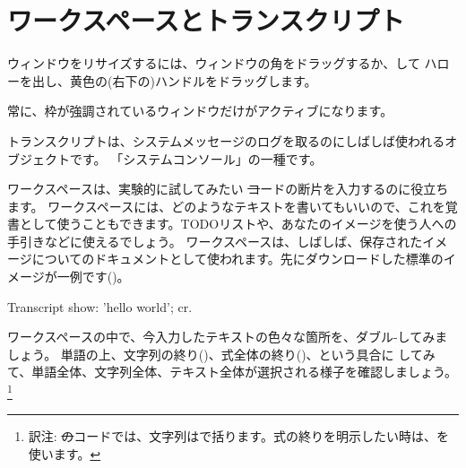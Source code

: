 \documentclass[a4paper,10pt,twoside]{book}
\begin{document}
\section{ワークスペースとトランスクリプト}


ウィンドウをリサイズするには、ウィンドウの角をドラッグするか、\metaclick して ハローを出し、黄色の(右下の)ハンドルをドラッグします。

常に、枠が強調されているウィンドウだけがアクティブになります。

トランスクリプトは、システムメッセージのログを取るのにしばしば使われるオブジェクトです。
「システムコンソール」の一種です。

ワークスペースは、実験的に試してみたい \st コードの断片を入力するのに役立ちます。
ワークスペースには、どのようなテキストを書いてもいいので、これを覚書として使うこともできます。TODOリストや、あなたのイメージを使う人への手引きなどに使えるでしょう。
ワークスペースは、しばしば、保存されたイメージについてのドキュメントとして使われます。先にダウンロードした標準のイメージが一例です()。

\begin{code}{}
Transcript show: 'hello world'; cr.
\end{code}

ワークスペースの中で、今入力したテキストの色々な箇所を、ダブル-\click してみましょう。
単語の上、文字列の終り()、式全体の終り()、という具合に \click してみて、単語全体、文字列全体、テキスト全体が選択される様子を確認しましょう。\footnote{訳注: \st のコードでは、文字列はで括ります。式の終りを明示したい時は、を使います。}
\end{document}
